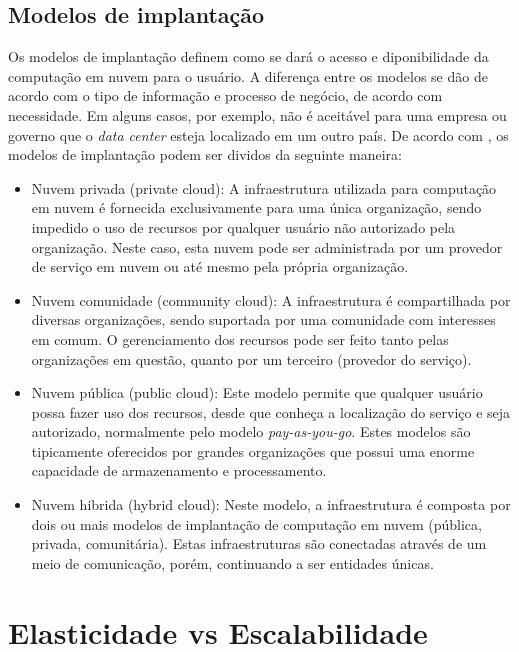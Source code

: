 \documentclass[twoside,english,brazilian]{UNISINOSmonografia}
\begin{document}
\subsection{Modelos de implantação}
Os modelos de implantação definem como se dará o acesso e diponibilidade da computação em nuvem para o usuário. A diferença entre os modelos se dão de acordo com o tipo de informação e processo de negócio, de acordo com necessidade.  Em alguns casos, por exemplo, não é aceitável para uma empresa ou governo que o \textit{data center} esteja localizado em um outro país. De acordo com , os modelos de implantação podem ser dividos da seguinte maneira:
\begin{itemize}
	\item Nuvem privada (private cloud): A infraestrutura utilizada para computação em nuvem é fornecida exclusivamente para uma única organização, sendo impedido o uso de recursos por qualquer usuário não autorizado pela organização. Neste caso, esta nuvem pode ser administrada por um provedor de serviço em nuvem ou até mesmo pela própria organização.
	\item Nuvem comunidade (community cloud): A infraestrutura é compartilhada por diversas organizações, sendo suportada por uma comunidade com interesses em comum. O gerenciamento dos recursos pode ser feito tanto pelas organizações em questão, quanto por um terceiro (provedor do serviço).
	\item Nuvem pública (public cloud): Este modelo permite que qualquer usuário possa fazer uso dos recursos, desde que conheça a localização do serviço e seja autorizado, normalmente pelo modelo \textit{pay-as-you-go}. Estes modelos são tipicamente oferecidos por grandes organizações que possui uma enorme capacidade de armazenamento e processamento.
	\item Nuvem hibrida (hybrid cloud): Neste modelo, a infraestrutura é composta por dois ou mais modelos de implantação de computação em nuvem (pública, privada, comunitária). Estas infraestruturas são conectadas através de um meio de comunicação, porém, continuando a ser entidades únicas.
\end{itemize}

\section{Elasticidade vs Escalabilidade}
\label{elastic}
\end{document}

